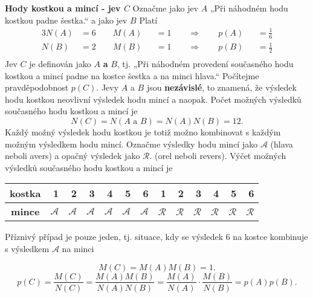 \wikitextrule
\begin{example}\label{mai:exam052}
  \textbf{Hody kostkou a mincí - jev \(C\)}\newline\small
  Označme jako jev \(A\) „Při náhodném hodu kostkou padne šestka.“ a jako jev \(B\)  Platí
  \begin{alignat*}{3}
    N(A) &= 6\qquad   M(A) &&=1 \qquad \Rightarrow \qquad p(A) &&= \frac{1}{6}  \\
    N(B) &= 2\qquad   M(B) &&=1 \qquad \Rightarrow \qquad p(B) &&= \frac{1}{2}  \\
  \end{alignat*}
  Jev \(C\) je definován jako \(A\) \textbf{a} \(B\), tj. „Při náhodném provedení současného hodu 
  kostkou a mincí padne na kostce šestka a na minci hlava.“ Počítejme pravděpodobnost \(p(C)\). 
  Jevy \(A\) a \(B\) jsou \textbf{nezávislé}, to znamená, že výsledek hodu kostkou neovlivní 
  výsledek hodu mincí a naopak. Počet možných výsledků současného hodu kostkou a mincí je
  \begin{equation*}
    N(C) = N(A \text{ a } B) = N(A)N(B) = 12.
  \end{equation*}
  Každý možný výsledek hodu kostkou je totiž možno kombinovat s každým možným výsledkem hodu mincí.
  Označme výsledky hodu mincí jako \(\mathcal{A}\) (hlava neboli avers) a opačný výsledek jako 
  \(\mathcal{R}\). (orel neboli revers). Výčet možných výsledků současného hodu kostkou a mincí je

  \begin{table}[h]
    \centering
    \begin{tabular}{c|rrrrrrrrrrrr}
      \textbf{kostka} & 1 & 2 & 3 & 4 & 5 & 6 & 1 & 2 & 3 & 4 & 5 & 6 \\ \hline
      \textbf{mince}  & \(\mathcal{A}\) & \(\mathcal{A}\) & \(\mathcal{A}\) & \(\mathcal{A}\) & 
                        \(\mathcal{A}\) & \(\mathcal{A}\) & \(\mathcal{R}\) & \(\mathcal{R}\) & 
                        \(\mathcal{R}\) & \(\mathcal{R}\) & \(\mathcal{R}\) & \(\mathcal{R}\) 
    \end{tabular}
  \end{table}
  
  Příznivý případ je pouze jeden, tj. situace, kdy se výsledek \num{6} na kostce kombinuje s 
  výsledkem \(\mathcal{A}\) na minci
  
  \begin{equation*}
    M(C) = M(A)M(B) = 1.
  \end{equation*}
  \begin{equation*}
    p(C) = \dfrac{M(C)}{N(C)} = \dfrac{M(A)M(B)}{N(A)N(B)} 
         = \dfrac{M(A)}{N(A)}\cdot\dfrac{M(B)}{N(B)} = p(A)p(B).
  \end{equation*}
  \normalsize
\end{example}